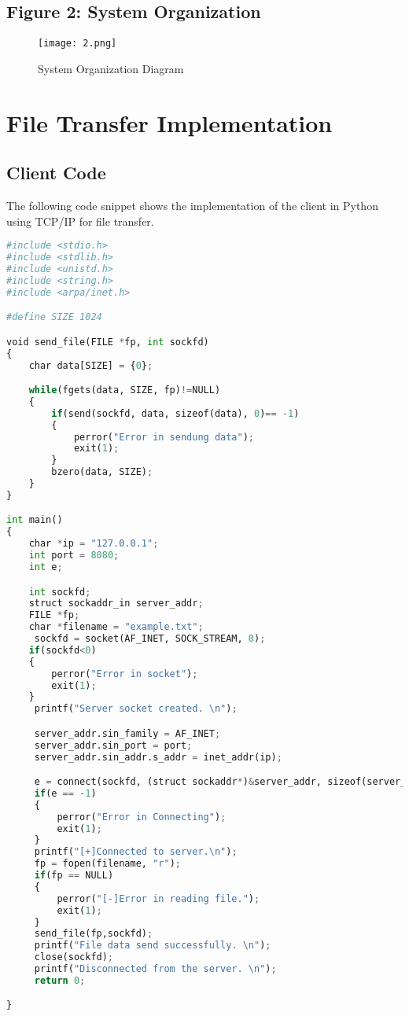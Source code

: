 \documentclass[a4paper,12pt]{article}
\begin{document}
\subsection{Figure 2: System Organization}
\begin{figure}[ht!]
    \centering
    \texttt{[image: 2.png]}
    \caption{System Organization Diagram}
    \label{fig:system_organization}
\end{figure}

\section{File Transfer Implementation}
\subsection{Client Code}
The following code snippet shows the implementation of the client in Python using TCP/IP for file transfer.

\begin{lstlisting}[language=Python, caption=Client Code for File Transfer]
#include <stdio.h>
#include <stdlib.h>
#include <unistd.h>
#include <string.h>
#include <arpa/inet.h>

#define SIZE 1024

void send_file(FILE *fp, int sockfd)
{
    char data[SIZE] = {0};

    while(fgets(data, SIZE, fp)!=NULL)
    {
        if(send(sockfd, data, sizeof(data), 0)== -1)
        {
            perror("Error in sendung data");
            exit(1);
        }
        bzero(data, SIZE);
    }
}

int main()
{
    char *ip = "127.0.0.1";
    int port = 8080;
    int e;

    int sockfd;
    struct sockaddr_in server_addr;
    FILE *fp;
    char *filename = "example.txt";
     sockfd = socket(AF_INET, SOCK_STREAM, 0);
    if(sockfd<0)
    {
        perror("Error in socket");
        exit(1);
    }
     printf("Server socket created. \n");

     server_addr.sin_family = AF_INET;
     server_addr.sin_port = port;
     server_addr.sin_addr.s_addr = inet_addr(ip);

     e = connect(sockfd, (struct sockaddr*)&server_addr, sizeof(server_addr));
     if(e == -1)
     {
         perror("Error in Connecting");
         exit(1);
     }
     printf("[+]Connected to server.\n");
     fp = fopen(filename, "r");
     if(fp == NULL)
     {
         perror("[-]Error in reading file.");
         exit(1);
     }
     send_file(fp,sockfd);
     printf("File data send successfully. \n");
     close(sockfd);
     printf("Disconnected from the server. \n");
     return 0;

}
\end{lstlisting}
\end{document}
